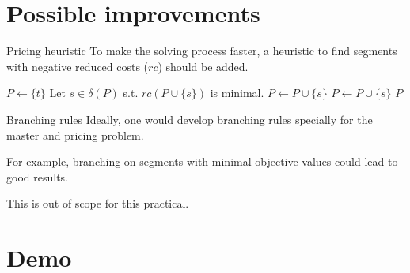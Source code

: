 \documentclass[fleqn]{beamer}
\begin{document}
	\section{Possible improvements}
    \begin{frame}{Pricing heuristic}
        To make the solving process faster,
        a heuristic to find segments with negative reduced costs ($rc$) should be added.
        
        \begin{algorithm}[H]
            \caption{Simple pricing heuristic}
            \begin{algorithmic}[1]
                \State $P\gets\{t\}$
                \State Let $s\in\delta(P)$ s.t. $rc(P\cup\{s\})$ is minimal. \label{nextnode}
                    \State $P\gets P\cup\{s\}$
                    \State {}
                    \State $P\gets P\cup\{s\}$
                    \State {}
                \Else
                    \State \Return $P$
                \EndIf
            \end{algorithmic}
        \end{algorithm}
    \end{frame}

    \begin{frame}{Branching rules}
        Ideally, one would develop branching rules specially for the master and pricing problem.     
        
        For example, branching on segments with minimal objective values could lead to good results.
        
        This is out of scope for this practical.
    \end{frame}
    
    \section{Demo}
\end{document}
